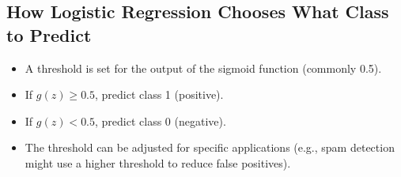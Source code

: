 \documentclass[10pt]{article}
\begin{document}
\subsection{How Logistic Regression Chooses What Class to Predict}
\begin{itemize}
    \item A threshold is set for the output of the sigmoid function (commonly 0.5).
    \item If \( g(z) \ge 0.5 \), predict class 1 (positive).
    \item If \( g(z) < 0.5 \), predict class 0 (negative).
    \item The threshold can be adjusted for specific applications (e.g., spam detection might use a higher threshold to reduce false positives).
\end{itemize}
\end{document}
